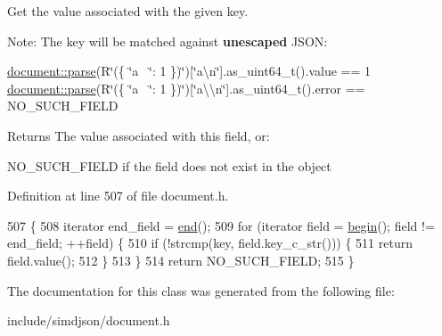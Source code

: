 Get the value associated with the given key. 

Note\+: The key will be matched against {\bfseries unescaped} J\+S\+ON\+:

\hyperlink{classsimdjson_1_1document_a6f11cda7c4a06fffdc00fdc97d98ae2b}{document\+::parse}(R\char`\"{}(\{ \char`\"{}a~\newline
\char`\"{}\+: 1 \})\char`\"{})\mbox{[}\char`\"{}a\textbackslash{}n\char`\"{}\mbox{]}.as\+\_\+uint64\+\_\+t().value == 1 \hyperlink{classsimdjson_1_1document_a6f11cda7c4a06fffdc00fdc97d98ae2b}{document\+::parse}(R\char`\"{}(\{ \char`\"{}a~\newline
\char`\"{}\+: 1 \})\char`\"{})\mbox{[}\char`\"{}a\textbackslash{}\textbackslash{}n\char`\"{}\mbox{]}.as\+\_\+uint64\+\_\+t().error == N\+O\+\_\+\+S\+U\+C\+H\+\_\+\+F\+I\+E\+LD

\begin{DoxyReturn}{Returns}
The value associated with this field, or\+:
\begin{DoxyItemize}
\item N\+O\+\_\+\+S\+U\+C\+H\+\_\+\+F\+I\+E\+LD if the field does not exist in the object 
\end{DoxyItemize}
\end{DoxyReturn}


Definition at line 507 of file document.\+h.


\begin{DoxyCode}
507                                                                                                         \{
508   iterator end\_field = \hyperlink{classsimdjson_1_1document_1_1object_a38ab9979d9eecb0b70768dcde9d12864}{end}();
509   \textcolor{keywordflow}{for} (iterator field = \hyperlink{classsimdjson_1_1document_1_1object_a88e638207141099532b524a8814540e0}{begin}(); field != end\_field; ++field) \{
510     \textcolor{keywordflow}{if} (!strcmp(key, field.key\_c\_str())) \{
511       \textcolor{keywordflow}{return} field.value();
512     \}
513   \}
514   \textcolor{keywordflow}{return} NO\_SUCH\_FIELD;
515 \}
\end{DoxyCode}


The documentation for this class was generated from the following file\+:\begin{DoxyCompactItemize}
\item 
include/simdjson/document.\+h\end{DoxyCompactItemize}
